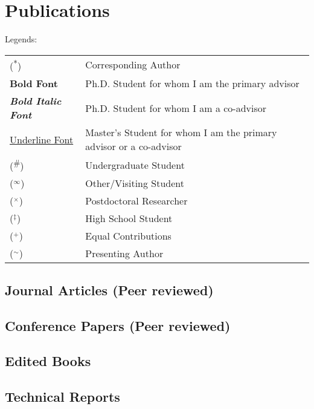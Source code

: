 \documentclass[letterpaper, 12pt]{extarticle}
\begin{document}
\section{Publications}%
Legends:

\begin{tabular}{p{}p{}}
(\textsuperscript{*})                     & Corresponding Author \\
\textbf{Bold Font}                        & Ph.D. Student for whom I am the primary advisor  \\
\textbf{\textit{Bold Italic Font}}        & Ph.D. Student for whom I am a co-advisor  \\
\underline{Underline Font}                & Master's Student for whom I am the primary advisor
or a co-advisor                          \\
(\textsuperscript{\#})                    & Undergraduate Student \\
($^\infty$)                               & Other/Visiting Student \\
($^\times$)                               & Postdoctoral Researcher \\
($^\ddagger$)                             & High School Student \\
($^+$)                                    & Equal Contributions \\
($^\sim$)                                 & Presenting Author \\
\end{tabular}
\nocite{*}
\subsection{Journal Articles (Peer reviewed)}%
\printbibliography[heading=none, type=article, resetnumbers=true]

\subsection{Conference Papers (Peer reviewed)}%
\printbibliography[heading=none, type=inproceedings, notkeyword=podium]

\subsection{Edited Books}%
\printbibliography[heading=none, type=book]

\subsection{Technical Reports}%
\printbibliography[heading=none, type=report]
\end{document}
